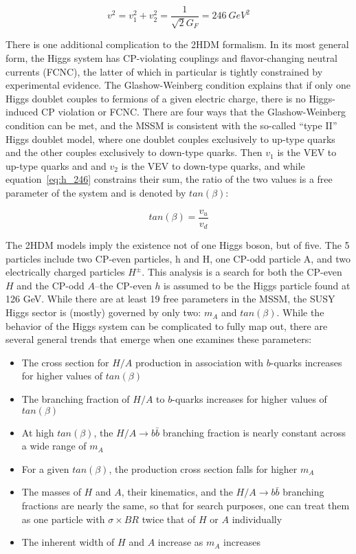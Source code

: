 \begin{equation}
	v^2 = v_1^2 + v_2^2 = \frac{1}{\sqrt{2}G_F} = 246\ GeV^2
	\label{eq:h_246}
\end{equation}

There is one additional complication to the 2HDM formalism.  In its most general form, the Higgs system has CP-violating couplings and flavor-changing neutral currents (FCNC), the latter of which in particular is tightly constrained by experimental evidence.  The Glashow-Weinberg condition explains that if only one Higgs doublet couples to fermions of a given electric charge, there is no Higgs-induced CP violation or FCNC.  There are four ways that the Glashow-Weinberg condition can be met, and the MSSM is consistent with the so-called ``type II'' Higgs doublet model, where one doublet couples exclusively to up-type quarks and the other couples exclusively to down-type quarks.  Then $v_1$ is the VEV to up-type quarks and and $v_2$ is the VEV to down-type quarks, and while equation~\ref{eq:h_246} constrains their sum, the ratio of the two values is a free parameter of the system and is denoted by $tan(\beta)$:

\begin{equation}
	tan(\beta) = \frac{v_u}{v_d}
\end{equation}

The 2HDM models imply the existence not of one Higgs boson, but of five.  The 5 particles include two CP-even particles, h and H, one CP-odd particle A, and two electrically charged particles $H^\pm$.   This analysis is a search for both the CP-even $H$ and the CP-odd $A$--the CP-even $h$ is assumed to be the Higgs particle found at 126 GeV.  While there are at least 19 free parameters in the MSSM, the SUSY Higgs sector is (mostly) governed by only two: $m_A$ and $tan(\beta)$.  While the behavior of the Higgs system can be complicated to fully map out, there are several general trends that emerge when one examines these parameters:

\begin{itemize}
	\item The cross section for $H/A$ production in association with $b$-quarks increases for higher values of $tan(\beta)$
	\item The branching fraction of $H/A$ to $b$-quarks increases for higher values of $tan(\beta)$
	\item At high $tan(\beta)$, the $H/A\rightarrow b\bar{b}$ branching fraction is nearly constant across a wide range of $m_A$
	\item For a given $tan(\beta)$, the production cross section falls for higher $m_A$
	\item The masses of $H$ and $A$, their kinematics, and the $H/A\rightarrow b\bar{b}$ branching fractions are nearly the same, so that for search purposes, one can treat them as one particle with $\sigma \times BR$ twice that of $H$ or $A$ individually
	\item The inherent width of $H$ and $A$ increase as $m_A$ increases 
\end{itemize}


